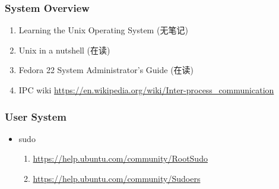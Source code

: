 \documentclass{article}
\begin{document}
\subsubsection{System Overview}
\begin{enumerate}
    \item Learning the Unix Operating System (无笔记)
    \item Unix in a nutshell (在读)
    \item Fedora 22 System Administrator's Guide (在读)
    \item IPC wiki \url{https://en.wikipedia.org/wiki/Inter-process_communication}
\end{enumerate}
\subsubsection{User System}
\begin{itemize}
    \item sudo
        \begin{enumerate}
            \item \url{https://help.ubuntu.com/community/RootSudo}
            \item \url{https://help.ubuntu.com/community/Sudoers}
        \end{enumerate}
\end{itemize}
\end{document}
